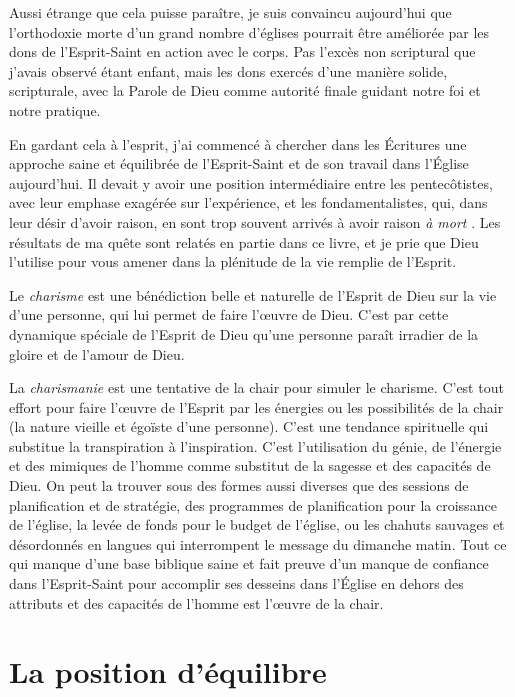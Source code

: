 Aussi étrange que cela puisse paraître, je suis convaincu aujourd'hui que
 l'orthodoxie morte d'un grand nombre d'églises pourrait être améliorée par les
 dons de l'Esprit-Saint en action avec le corps. Pas l'excès non scriptural que
 j'avais observé étant enfant, mais les dons exercés d'une manière solide,
 scripturale, avec la Parole de Dieu comme autorité finale guidant notre foi et
 notre pratique.

En gardant cela à l'esprit, j'ai commencé à chercher dans les Écritures une
 approche saine et équilibrée de l'Esprit-Saint et de son travail dans l'Église
 aujourd'hui. Il devait y avoir une position intermédiaire entre les
 pentecôtistes, avec leur emphase exagérée sur l'expérience, et les
 fondamentalistes, qui, dans leur désir d'avoir raison, en sont trop souvent
 arrivés à avoir raison \emph{à mort} .
 Les résultats de ma quête sont relatés en partie dans ce livre, et je prie que
 Dieu l'utilise pour vous amener dans la plénitude de la vie remplie de
 l'Esprit.

Le \emph{charisme} est une bénédiction belle et naturelle de l'Esprit de Dieu
 sur la vie d'une personne, qui lui permet de faire l'œuvre de Dieu. C'est par
 cette dynamique spéciale de l'Esprit de Dieu qu'une personne paraît irradier de
 la gloire et de l'amour de Dieu.

La \emph{charismanie} est une tentative de la chair pour simuler le charisme.
 C'est tout effort pour faire l'œuvre de l'Esprit par les énergies ou les
 possibilités de la chair (la nature vieille et égoïste d'une personne). C'est
 une tendance spirituelle qui substitue la transpiration à l'inspiration. C'est
 l'utilisation du génie, de l'énergie et des mimiques de l'homme comme substitut
 de la sagesse et des capacités de Dieu. On peut la trouver sous des formes
 aussi diverses que des sessions de planification et de stratégie, des
 programmes de planification pour la croissance de l'église, la levée de fonds
 pour le budget de l'église, ou les chahuts sauvages et désordonnés en langues
 qui interrompent le message du dimanche matin. Tout ce qui manque d'une base
 biblique saine et fait preuve d'un manque de confiance dans l'Esprit-Saint pour
 accomplir ses desseins dans l'Église en dehors des attributs et des capacités
 de l'homme est l'œuvre de la chair.

\section*{La position d'équilibre}

